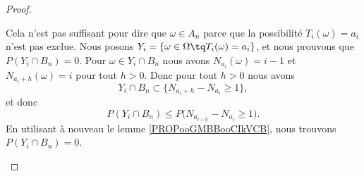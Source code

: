 \begin{proof}
\begin{subproof}
        Cela n'est pas suffisant pour dire que \( \omega\in A_n\) parce que la possibilité \( T_i(\omega)=a_i\) n'est pas exclue.
        Nous posons \( Y_i=\{ \omega\in \Omega\tq T_i(\omega)=a_i \}\), et nous prouvons que \( P(Y_i\cap B_n)=0\). Pour \( \omega\in Y_i\cap B_n\) nous avons \( N_{a_i}(\omega)=i-1\) et \( N_{a_i+h}(\omega)=i\) pour tout \( h>0\). Donc pour tout \( h>0\) nous avons
        \begin{equation}
            Y_i\cap B_n\subset\{ N_{a_i+h}-N_{a_i}\geq 1 \}, 
        \end{equation}
        et donc
        \begin{equation}
            P(Y_i\cap B_n)\leq P\big( N_{a_{i+h}}-N_{a_i}\geq 1 \big).
        \end{equation}
        En utilisant à nouveau le lemme \ref{PROPooGMBBooCIkVCB}, nous trouvons \( P(Y_i\cap B_n)=0\).


\end{subproof}
\end{proof}
